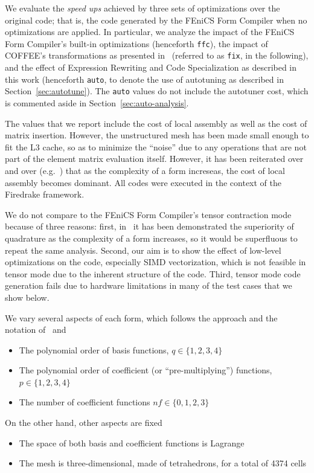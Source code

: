 We evaluate the \textit{speed ups} achieved by three sets of optimizations over the original code; that is, the code generated by the FEniCS Form Compiler when no optimizations are applied. In particular, we analyze the impact of the FEniCS Form Compiler's built-in optimizations (henceforth \texttt{ffc}), the impact of COFFEE's transformations as presented in~\cite{Luporini} (referred to as \texttt{fix}, in the following), and the effect of Expression Rewriting and Code Specialization as described in this work (henceforth \texttt{auto}, to denote the use of autotuning as described in Section~\ref{sec:autotune}). The \texttt{auto} values do not include the autotuner cost, which is commented aside in Section~\ref{sec:auto-analysis}. 


The values that we report include the cost of local assembly as well as the cost of matrix insertion. However, the unstructured mesh has been made small enough to fit the L3 cache, so as to minimize the ``noise'' due to any operations that are not part of the element matrix evaluation itself. However, it has been reiterated over and over (e.g.~\cite{quadrature1}) that as the complexity of a form increseas, the cost of local assembly becomes dominant. All codes were executed in the context of the Firedrake framework.

We do not compare to the FEniCS Form Compiler's tensor contraction mode~\citep{tensor-kirby} because of three reasons: first, in~\citep{quadrature-olegaard} it has been demonstrated the superiority of quadrature as the complexity of a form increases, so it would be superfluous to repeat the same analysis. Second, our aim is to show the effect of low-level optimizations on the code, especially SIMD vectorization, which is not feasible in tensor mode due to the inherent structure of the code. Third, tensor mode code generation fails due to hardware limitations in many of the test cases that we show below.

We vary several aspects of each form, which follows the approach and the notation of~\citep{quadrature-olegaard} and~\citep{francis}
\begin{itemize}
\item The polynomial order of basis functions, $q \in \lbrace1, 2, 3, 4\rbrace$
\item The polynomial order of coefficient (or ``pre-multiplying'') functions, $p \in \lbrace1, 2, 3, 4\rbrace$
\item The number of coefficient functions $nf \in \lbrace0, 1, 2, 3\rbrace$
\end{itemize}
On the other hand, other aspects are fixed 
\begin{itemize}
\item The space of both basis and coefficient functions is Lagrange
\item The mesh is three-dimensional, made of tetrahedrons, for a total of 4374 cells
\end{itemize}

